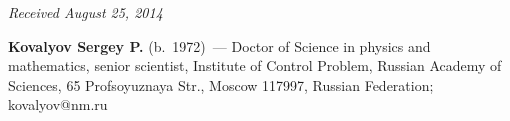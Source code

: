 \vspace*{-3pt}

\hfill{\small\textit{Received August 25, 2014}}



 \Contrl

 \noindent
 \textbf{Kovalyov Sergey P.} (b.\ 1972)~--- Doctor of Science in physics and mathematics,
senior scientist, Institute of Control Problem, Russian Academy of Sciences, 65 Profsoyuznaya
Str., Moscow 117997, Russian Federation; kovalyov@nm.ru
\label{end\stat}

\renewcommand{\bibname}{\protect\rm Литература}